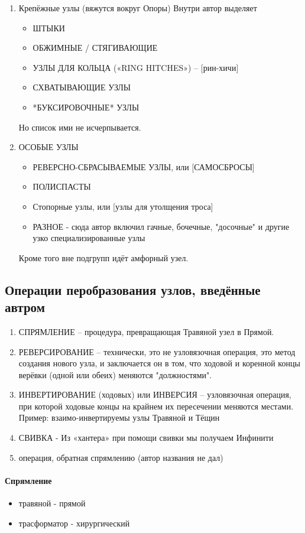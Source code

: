 \begin{enumerate}
\begin{enumerate}
\end{enumerate}
\item Крепёжные узлы (вяжутся вокруг Опоры)
Внутри автор выделяет
\begin{itemize}
\item ШТЫКИ
\item ОБЖИМНЫЕ / СТЯГИВАЮЩИЕ
\item УЗЛЫ ДЛЯ КОЛЬЦА («RING HITCHES») – [рин-хичи]
\item СХВАТЫВАЮЩИЕ УЗЛЫ
\item *БУКСИРОВОЧНЫЕ* УЗЛЫ
\end{itemize}
Но список ими не исчерпывается.
\item ОСОБЫЕ УЗЛЫ
\begin{itemize}
\item РЕВЕРСНО-СБРАСЫВАЕМЫЕ УЗЛЫ, или [САМОСБРОСЫ]
\item ПОЛИСПАСТЫ
\item Стопорные узлы, или [узлы для утолщения троса]
\item РАЗНОЕ - сюда автор включил гачные, бочечные, "досочные" и другие узко специализированные узлы
\end{itemize}
Кроме того вне подгрупп идёт амфорный узел.
\end{enumerate}

\subsection{Операции перобразования узлов, введённые автром}

\begin{enumerate}
\item СПРЯМЛЕНИЕ  – процедура, превращающая Травяной узел в Прямой. 
\item РЕВЕРСИРОВАНИЕ  – технически, это не узловязочная операция, это метод создания нового узла, и заключается он в том, что ходовой и коренной концы верёвки (одной или обеих) меняются "должностями".
\item ИНВЕРТИРОВАНИЕ (ходовых) или ИНВЕРСИЯ  – узловязочная операция, при которой ходовые концы на крайнем их пересечении меняются местами. Пример: взаимо-инвертируемы узлы Травяной и Тёщин 
\item СВИВКА - Из «хантера» при помощи свивки мы получаем Инфинити
\item операция, обратная спрямлению (автор названия не дал)
\end{enumerate}


\paragraph{Спрямление}
\begin{itemize}
\item травяной - прямой
\item трасформатор - хирургический
\end{itemize}

